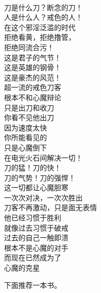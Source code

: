 \begin{poem}[戒色悍刀行]
    \begin{multicols}{2}
        \centering~\\
        刀是什么刀？断念的刀！ \\ 人是什么人？戒色的人！ \\ 在这个邪淫泛滥的时代 \\ 拒绝看黄，拒绝撸管， \\ 拒绝同流合污！ \\ 这是君子的气节！ \\ 这是英雄的钢骨！ \\ 这是豪杰的风范！ \\ 超一流的戒色刀客 \\ 根本不和心魔辩论 \\ 只是出刀和收刀 \\ 你看不见他出刀 \\ 因为速度太快 \\ 你所能看见的 \\ 只是心魔倒下 \\ 在电光火石间解决一切！ \\ 刀的猛！刀的快！ \\ 刀的气势！刀的强悍！ \\ 这一切都让心魔胆寒 \\ 一次次对决，一次次胜出 \\ 刀客不再激动，只是面无表情 \\ 他已经习惯于胜利 \\ 就像过去习惯于破戒 \\ 过去的自己一触即溃 \\ 根本不是心魔的对手 \\ 而现在已然成为了 \\ 心魔的克星
    \end{multicols}
\end{poem}

下面推荐一本书。

